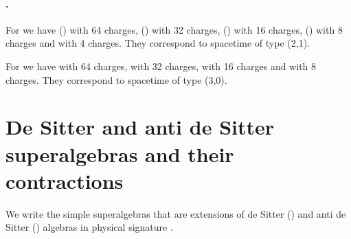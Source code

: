 \documentclass[a4paper,12pt]{article}
\begin{document}
 \paragraph{\coordHE{}.} For \coordHE{}  we have \coordHE{} (\coordHE{}) with 64
 charges, \coordHE{} (\coordHE{}) with 32 charges, \coordHE{}
 (\coordHE{}) with 16 charges, \coordHE{} (\coordHE{}) with 8
 charges and \coordHE{} with 4 charges. They correspond to  spacetime of type (2,1).

\smallskip

\noindent  For \coordHE{}  we have \coordHE{} with 64
charges, \coordHE{} with 32 charges, \coordHE{} with
16 charges and  \coordHE{} with 8 charges. They correspond
to  spacetime of type (3,0).




\section{De Sitter and anti de Sitter superalgebras and their contractions}
We write the simple superalgebras that are extensions of de Sitter
(\coordHE{}) and anti de Sitter  (\coordHE{}) algebras in
physical signature \coordHE{}.
\end{document}

